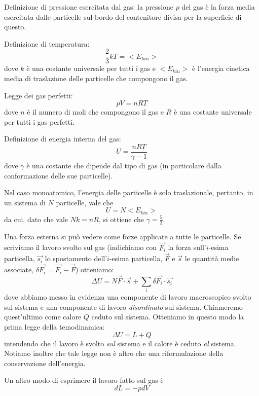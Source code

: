 \documentclass[../main.tex]{subfiles}
\begin{document}
Definizione di pressione esercitata dal gas: la pressione $p$ del gas è la forza media esercitata dalle particelle sul bordo del contenitore divisa
per la superficie di questo.

Definizione di temperatura:
\begin{equation}
	\label{term:temperatura}
	\frac{2}{3}kT=<E_{kin}>
\end{equation}
dove $k$ è una costante universale per tutti i gas e  $<E_{kin}>$ è l'energia cinetica media di traslazione delle particelle che compongono il gas.

Legge dei gas perfetti:
\begin{equation}
	\label{term:perfetti}
	pV=nRT
\end{equation}
dove $n$ è il numero di moli che compongono il gas e $R$ è una costante universale per tutti i gas perfetti.

Definizione di energia interna del gas:
\begin{equation}
	\label{term:uinterna}
	U = \frac{nRT}{\gamma-1}
\end{equation}
dove $\gamma$ è una costante che dipende dal tipo di gas (in particolare dalla conformazione delle sue particelle).

Nel caso monoatomico, l'energia delle particelle è solo traslazionale, pertanto, in un sistema di $N$ particelle, vale che
\[
	U = N <E_{kin}>
\]
da cui, dato che vale $Nk = nR$, si ottiene che $\gamma = \frac{5}{3}$.

Una forza esterna si può vedere come forze applicate a tutte le particelle. Se scriviamo il lavoro svolto sul gas (indichiamo con $\vec{F_i}$ la forza
sull'$i$-esima particella, $\vec{s_i}$ lo spostamento dell'$i$-esima particella, $\vec F$ e $\vec s$ le quantità medie associate,
$\delta \vec{F_i} = \vec{F_i}-\vec F$) otteniamo:
\[
	\Delta U  = N \vec F \cdot \vec s + \sum_i \delta \vec {F_i}\cdot \vec {s_i}
\]
dove abbiamo messo in evidenza una componente di lavoro macroscopico svolto sul sistema e una componente di lavoro \emph{disordinato} sul sistema.
Chiameremo quest'ultimo come calore $Q$ ceduto sul sistema. Otteniamo in questo modo la prima legge della temodinamica:
\begin{equation}
	\label{term:1legge}
	\Delta U = L + Q
\end{equation}
intendendo che il lavoro è svolto \emph{sul} sistema e il calore è ceduto \emph{al} sistema. Notiamo inoltre che tale legge non è altro che una
riformulazione della conservazione dell'energia.

Un altro modo di esprimere  il lavoro fatto sul gas è
\begin{equation}
	\label{term:lavoro}
	dL = -pdV
\end{equation}
\end{document}
